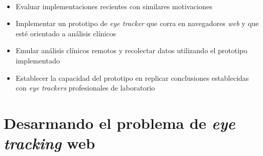 \documentclass[aspectratio=169]{beamer}
\begin{document}
\begin{frame}{~}

  \begin{itemize}
    \item Evaluar implementaciones recientes con similares motivaciones

    \item Implementar un prototipo de \textit{eye tracker} que corra en
      navegadores \textit{web} y que esté orientado a análisis clínicos

    \item Emular análisis clínicos remotos y recolectar datos utilizando el
      prototipo implementado

    \item Establecer la capacidad del prototipo en replicar conclusiones
      establecidas con \textit{eye trackers} profesionales de laboratorio

  \end{itemize}

\end{frame}

\section{Desarmando el problema de \textit{eye tracking} web}
\end{document}
